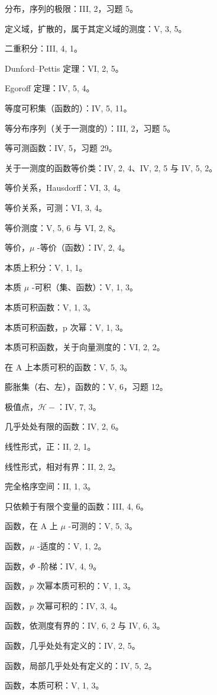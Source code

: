 分布，序列的极限：III, 2，习题 5。

定义域，扩散的，属于其定义域的测度：V, 3, 5。

二重积分：III, 4, 1。

Dunford--Pettis 定理：VI, 2, 5。

Egoroff 定理：IV, 5, 4。

等度可积集（函数的）：IV, 5, 11。

等分布序列（关于一测度的）：III, 2，习题 5。

等可测函数：IV, 5，习题 29。

关于一测度的函数等价类：IV, 2, 4、IV, 2, 5 与 IV, 5, 2。

等价关系，Hausdorff：VI, 3, 4。

等价关系，可测：VI, 3, 4。

等价测度：V, 5, 6 与 VI, 2, 8。

等价，\(\mu\) -等价（函数）：IV, 2, 4。

本质上积分：V, 1, 1。

本质 \(\mu\) -可积（集、函数）：V, 1, 3。

本质可积函数：V, 1, 3。

本质可积函数，p 次幂：V, 1, 3。

本质可积函数，关于向量测度的：VI, 2, 2。

在 A 上本质可积的函数：V, 5, 3。

膨胀集（右、左），函数的：V, 6，习题 12。

极值点，\(\mathcal{H}-\)：IV, 7, 3。

几乎处处有限的函数：IV, 2, 6。

线性形式，正：II, 2, 1。

线性形式，相对有界：II, 2, 2。

完全格序空间：II, 1, 3。

只依赖于有限个变量的函数：III, 4, 6。

函数，在 A 上 \(\mu\) -可测的：V, 5, 3。

函数，\(\mu\) -适度的：V, 1, 2。

函数，\(\Phi\) -阶梯：IV, 4, 9。

函数，\(p\) 次幂本质可积的：V, 1, 3。

函数，\(p\) 次幂可积的：IV, 3, 4。

函数，依测度有界的：IV, 6, 2 与 IV, 6, 3。

函数，几乎处处有定义的：IV, 2, 5。

函数，局部几乎处处有定义的：IV, 5, 2。

函数，本质可积：V, 1, 3。


